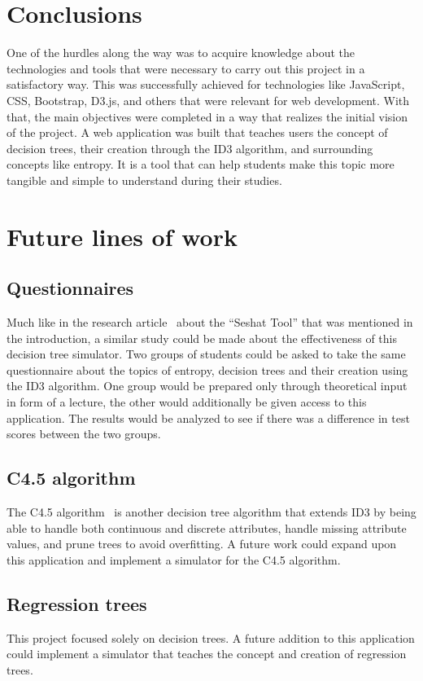 
\section{Conclusions}
One of the hurdles along the way was to acquire knowledge about the technologies and tools that were necessary to carry out this project in a satisfactory way. This was successfully achieved for technologies like JavaScript, CSS, Bootstrap, D3.js, and others that were relevant for web development.
With that, the main objectives were completed in a way that realizes the initial vision of the project. A web application was built that teaches users the concept of decision trees, their creation through the ID3 algorithm, and surrounding concepts like entropy.
It is a tool that can help students make this topic more tangible and simple to understand during their studies.

\section{Future lines of work}
\subsection{Questionnaires}
Much like in the research article~\cite{https://doi.org/10.1002/cae.22036} about the ``Seshat Tool'' that was mentioned in the introduction, a similar study could be made about the effectiveness of this decision tree simulator. Two groups of students could be asked to take the same questionnaire about the topics of entropy, decision trees and their creation using the ID3 algorithm. One group would be prepared only through theoretical input in form of a lecture, the other would additionally be given access to this application. The results would be analyzed to see if there was a difference in test scores between the two groups.

\subsection{C4.5 algorithm}
The C4.5 algorithm~\cite{c4_5_wiki} is another decision tree algorithm that extends ID3 by being able to handle both continuous and discrete attributes, handle missing attribute values, and prune trees to avoid overfitting. A future work could expand upon this application and implement a simulator for the C4.5 algorithm.

\subsection{Regression trees}
This project focused solely on decision trees. A future addition to this application could implement a simulator that teaches the concept and creation of regression trees.